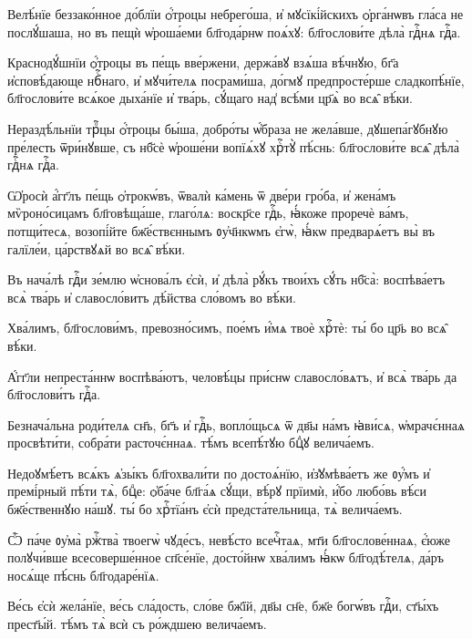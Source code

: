 \hKv Велѣ́нїе беззако́нное до́блїи ѻ҆́троцы небрего́ша, и҆  мꙋсїкі́йскихъ ѻ҆рга́нѡвъ гла́са не послꙋ́шаша, но въ пещѝ  ѡ҆роша́еми бл҃года́рнѡ поѧ́хꙋ: бл҃гослови́те дѣла̀ гдⷭ҇нѧ  гдⷭ҇а. 

\hKv Краснодꙋ́шнїи ѻ҆́троцы въ пе́щь вве́ржени, держа́вꙋ взѧ́ша  вѣ́чнꙋю, бг҃а и҆сповѣ́дающе нбⷭ҇наго, и҆ мꙋчи́телѧ  посрами́ша, до́гмꙋ предпросте́рше сладкопѣ́нїе,  бл҃гослови́те всѧ́кое дыха́нїе и҆ тва́рь, сꙋ́щаго над̾  всѣ́ми цр҃ѧ̀ во всѧ̑ вѣ́ки. 

\hKv Нераздѣ́льнїи трⷪ҇цы ѻ҆́троцы бы́ша, добро́ты ѡ҆́браза не  жела́вше, дꙋшепа́гꙋбнꙋю пре́лесть ѿри́нꙋвше, съ нб҃сѐ  ѡ҆роше́ни вопїѧ́хꙋ хрⷭ҇тꙋ̀ пѣ́снь: бл҃гослови́те всѧ̑  дѣла̀ гдⷭ҇нѧ гдⷭ҇а.  

\hKv Ѡ҆росѝ а҆́гг҃лъ пе́щь ѻ҆трокѡ́въ, ѿвалѝ ка́мень ѿ  две́ри гро́ба, и҆ жена́мъ мѷроно́сицамъ бл҃говѣща́ше,  глаго́лѧ: воскр҃се гдⷭ҇ь, ꙗ҆́коже проречѐ ва́мъ,  потщи́тесѧ, возопі́йте бж҃е́ствєннымъ ᲂу҆ч҃нкѡмъ є҆гѡ̀,  ꙗ҆́кѡ предварѧ́етъ вы̀ въ галїле́и, ца́рствꙋѧй во всѧ̑  вѣ́ки. 

\hKv Въ нача́лѣ гдⷭ҇и зе́млю ѡ҆снова́лъ є҆сѝ, и҆ дѣла̀ рꙋ́къ  твои́хъ сꙋ́ть нб҃са̀: воспѣва́етъ всѧ̀ тва́рь и҆  славосло́витъ дѣ́йства сло́вомъ во вѣ́ки. 

\hKv Хва́лимъ, бл҃гослови́мъ, превозно́симъ, пое́мъ и҆́мѧ твоѐ  хрⷭ҇тѐ: ты́ бо цр҃ь во всѧ̑ вѣ́ки. 

\hKv А҆́гг҃ли непреста́ннѡ воспѣва́ютъ, человѣ́цы при́снѡ  славосло́вѧтъ, и҆ всѧ̀ тва́рь да бл҃гослови́тъ гдⷭ҇а.  
%

\hKv Безнача́льна роди́телѧ сн҃ъ, бг҃ъ и҆ гдⷭ҇ь, вопло́щьсѧ ѿ  дв҃ы на́мъ ꙗ҆ви́сѧ, ѡ҆мрачє́ннаѧ просвѣти́ти, собра́ти  расточє́ннаѧ. тѣ́мъ всепѣ́тꙋю бцⷣꙋ велича́емъ. 
%

\hKv Недоꙋмѣ́етъ всѧ́къ ѧ҆зы́къ бл҃гохвали́ти по  достоѧ́нїю, и҆з̾ꙋмѣва́етъ же ᲂу҆́мъ и҆ премі́рный пѣ́ти  тѧ̀, бцⷣе: ѻ҆ба́че бл҃га́ѧ сꙋ́щи, вѣ́рꙋ прїимѝ, и҆́бо  любо́вь вѣ́си бж҃е́ственнꙋю на́шꙋ. ты́ бо хрⷭ҇тїа́нъ є҆сѝ  предста́тельница, тѧ̀ велича́емъ. 

\hKv Ѽ па́че ᲂу҆ма̀ ржⷭ҇тва̀ твоегѡ̀ чꙋде́съ, невѣ́сто  всечⷭ҇таѧ, мт҃и бл҃гослове́ннаѧ, є҆́юже полꙋчи́вше  всесоверше́нное сп҃се́нїе, досто́йнѡ хва́лимъ ꙗ҆́кѡ  бл҃годѣ́телѧ, да́ръ носѧ́ще пѣ́снь бл҃годаре́нїѧ. 
%

\hKv Ве́сь є҆сѝ жела́нїе, ве́сь сла́дость, сло́ве бж҃їй, дв҃ы  сн҃е, бж҃е богѡ́въ гдⷭ҇и, ст҃ы́хъ прест҃ы́й. тѣ́мъ тѧ̀ всѝ  съ ро́ждшею велича́емъ.  

